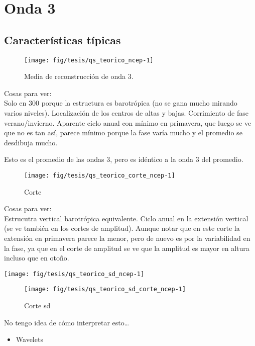 \documentclass[spanish,a4paper]{book}
\providecommand{\tightlist}{%
  \setlength{\itemsep}{0pt}\setlength{\parskip}{0pt}}
\begin{document}
\chapter{Onda 3}\label{onda-3}

\section{Características típicas}\label{caracteristicas-tipicas}

\begin{figure}
\texttt{[image: fig/tesis/qs\_teorico\_ncep-1]} \caption{Media de reconstrucción de onda 3.}\label{fig:qs_teorico_ncep}
\end{figure}

Cosas para ver:\\
Solo en 300 porque la estructura es barotrópica (no se gana mucho
mirando varios niveles). Localización de los centros de altas y bajas.
Corrimiento de fase verano/invierno. Aparente ciclo anual con mínimo en
primavera, que luego se ve que no es tan así, parece mínimo porque la
fase varía mucho y el promedio se desdibuja mucho.

Esto es el promedio de las ondas 3, pero es idéntico a la onda 3 del
promedio.

\begin{figure}
\texttt{[image: fig/tesis/qs\_teorico\_corte\_ncep-1]} \caption{Corte}\label{fig:qs_teorico_corte_ncep}
\end{figure}

Cosas para ver:\\
Estrucutra vertical barotrópica equivalente. Ciclo anual en la extensión
vertical (se ve también en los cortes de amplitud). Aunque notar que en
este corte la extensión en primavera parece la menor, pero de nuevo es
por la variabilidad en la fase, ya que en el corte de amplitud se ve que
la amplitud es mayor en altura incluso que en otoño.

\texttt{[image: fig/tesis/qs\_teorico\_sd\_ncep-1]}

\begin{figure}
\texttt{[image: fig/tesis/qs\_teorico\_sd\_corte\_ncep-1]} \caption{Corte sd}\label{fig:qs_teorico_sd_corte_ncep}
\end{figure}

No tengo idea de cómo interpretar esto\ldots{}

\begin{itemize}
\tightlist
\item
  Wavelets
\end{itemize}
\end{document}
